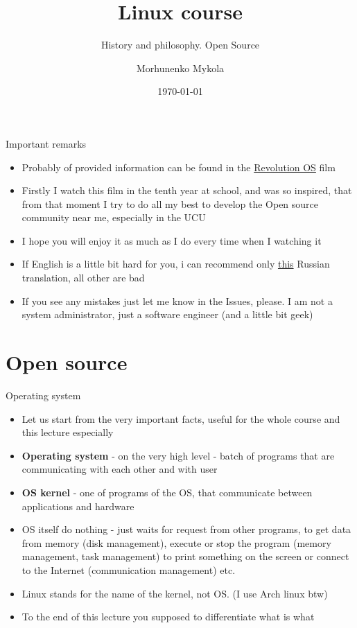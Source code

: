 \documentclass[usenames,dvipsnames,10pt,aspectratio=169]{beamer}
\title{Linux course}
\subtitle{History and philosophy. \newline Open Source}
\date[\today]{\small\today}
\author[Morhunenko Mykola]{Morhunenko Mykola}
\institute{APPS@UCU}
\begin{document}
\begin{frame}
\titlepage
\end{frame}

\begin{frame}{Important remarks}
    \begin{itemize}
        \item Probably  of provided information can be found in the \href{https://www.youtube.com/watch?v=Eluzi70O-P4}{Revolution OS} film
        \item Firstly I watch this film in the tenth year at school, and was so inspired, that from that moment I try to do all my best to develop the Open source community near me, especially in the UCU
        \item I hope you will enjoy it as much as I do every time when I watching it
        \item If English is a little bit hard for you, i can recommend only \href{https://www.youtube.com/watch?v=n1F_MfLRlX0}{this} Russian translation, all other are  bad
        \item If you see any mistakes just let me know in the Issues, please. I am not a system administrator, just a software engineer (and a little bit geek)
    \end{itemize}
\end{frame}

\begin{frame}{\contentsname}
\tableofcontents
\end{frame}

\section{Open source}

\begin{frame}{Operating system}
    \begin{itemize}
        \item Let us start from the very important facts, useful for the whole course and this lecture especially
        \item \textbf{Operating system} - on the very high level - batch of programs that are communicating with each other and with user
        \item \textbf{OS kernel} - one of programs of the OS, that communicate between applications and hardware
        \item OS itself do nothing - just waits for request from other programs, to get data from memory (disk management), execute or stop the program (memory management, task management) to print something on the screen or connect to the Internet (communication management) etc.
        \item Linux stands for the name of the kernel, not OS. (I use Arch linux btw)
        \item To the end of this lecture you supposed to differentiate what is what
    \end{itemize}
\end{frame}
\end{document}
